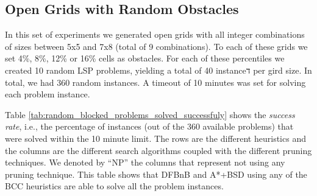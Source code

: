 \documentclass[letterpaper]{article} %
\begin{document}
\subsection{Open Grids with Random Obstacles}

In this set of experiments we generated open grids with all integer combinations of sizes between 5x5 and 7x8 (total of 9 combinations). To each of these grids we set 4\%, 8\%, 12\% or 16\% cells as obstacles. For each of these percentiles we created 10 random LSP problems, yielding a total of 40 instanceד per gird size. In total, we had 360 random instances. A timeout of 10 minutes was set for solving each problem instance. %



Table \ref{tab:random_blocked_problems_solved_successfuly} shows the \emph{success rate}, i.e., the percentage of instances (out of the 360 available problems) that were solved within the 10 minute limit. The rows are the different heuristics and the columns are the different search algorithms coupled with the different pruning techniques.
We denoted by ``NP'' the columns that represent not using any pruning technique. This table shows that DFBnB
and A*+BSD using any of the BCC heuristics are able to solve all the problem instances.
\end{document}
